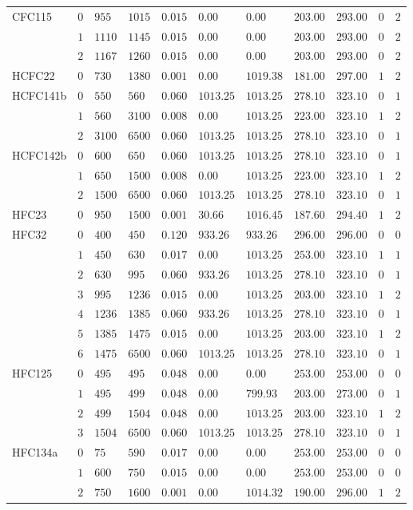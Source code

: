 \begin{table}
\begin{tabular}{lllllllllll}
CFC115 & $0$ & $955$ & $1015$ & $0.015$ & $0.00$ & $0.00$ & $203.00$ & $293.00$ & $0$ & $2$\tabularnewline
& $1$ & $1110$ & $1145$ & $0.015$ & $0.00$ & $0.00$ & $203.00$ & $293.00$ & $0$ & $2$\tabularnewline
& $2$ & $1167$ & $1260$ & $0.015$ & $0.00$ & $0.00$ & $203.00$ & $293.00$ & $0$ & $2$\tabularnewline
HCFC22 & $0$ & $730$ & $1380$ & $0.001$ & $0.00$ & $1019.38$ & $181.00$ & $297.00$ & $1$ & $2$\tabularnewline
HCFC141b & $0$ & $550$ & $560$ & $0.060$ & $1013.25$ & $1013.25$ & $278.10$ & $323.10$ & $0$ & $1$\tabularnewline
& $1$ & $560$ & $3100$ & $0.008$ & $0.00$ & $1013.25$ & $223.00$ & $323.10$ & $1$ & $2$\tabularnewline
& $2$ & $3100$ & $6500$ & $0.060$ & $1013.25$ & $1013.25$ & $278.10$ & $323.10$ & $0$ & $1$\tabularnewline
HCFC142b & $0$ & $600$ & $650$ & $0.060$ & $1013.25$ & $1013.25$ & $278.10$ & $323.10$ & $0$ & $1$\tabularnewline
& $1$ & $650$ & $1500$ & $0.008$ & $0.00$ & $1013.25$ & $223.00$ & $323.10$ & $1$ & $2$\tabularnewline
& $2$ & $1500$ & $6500$ & $0.060$ & $1013.25$ & $1013.25$ & $278.10$ & $323.10$ & $0$ & $1$\tabularnewline
HFC23 & $0$ & $950$ & $1500$ & $0.001$ & $30.66$ & $1016.45$ & $187.60$ & $294.40$ & $1$ & $2$\tabularnewline
HFC32 & $0$ & $400$ & $450$ & $0.120$ & $933.26$ & $933.26$ & $296.00$ & $296.00$ & $0$ & $0$\tabularnewline
& $1$ & $450$ & $630$ & $0.017$ & $0.00$ & $1013.25$ & $253.00$ & $323.10$ & $1$ & $1$\tabularnewline
& $2$ & $630$ & $995$ & $0.060$ & $933.26$ & $1013.25$ & $278.10$ & $323.10$ & $0$ & $1$\tabularnewline
& $3$ & $995$ & $1236$ & $0.015$ & $0.00$ & $1013.25$ & $203.00$ & $323.10$ & $1$ & $2$\tabularnewline
& $4$ & $1236$ & $1385$ & $0.060$ & $933.26$ & $1013.25$ & $278.10$ & $323.10$ & $0$ & $1$\tabularnewline
& $5$ & $1385$ & $1475$ & $0.015$ & $0.00$ & $1013.25$ & $203.00$ & $323.10$ & $1$ & $2$\tabularnewline
& $6$ & $1475$ & $6500$ & $0.060$ & $1013.25$ & $1013.25$ & $278.10$ & $323.10$ & $0$ & $1$\tabularnewline
HFC125 & $0$ & $495$ & $495$ & $0.048$ & $0.00$ & $0.00$ & $253.00$ & $253.00$ & $0$ & $0$\tabularnewline
& $1$ & $495$ & $499$ & $0.048$ & $0.00$ & $799.93$ & $203.00$ & $273.00$ & $0$ & $1$\tabularnewline
& $2$ & $499$ & $1504$ & $0.048$ & $0.00$ & $1013.25$ & $203.00$ & $323.10$ & $1$ & $2$\tabularnewline
& $3$ & $1504$ & $6500$ & $0.060$ & $1013.25$ & $1013.25$ & $278.10$ & $323.10$ & $0$ & $1$\tabularnewline
HFC134a & $0$ & $75$ & $590$ & $0.017$ & $0.00$ & $0.00$ & $253.00$ & $253.00$ & $0$ & $0$\tabularnewline
& $1$ & $600$ & $750$ & $0.015$ & $0.00$ & $0.00$ & $253.00$ & $253.00$ & $0$ & $0$\tabularnewline
& $2$ & $750$ & $1600$ & $0.001$ & $0.00$ & $1014.32$ & $190.00$ & $296.00$ & $1$ & $2$\tabularnewline

\end{tabular}
\end{table}
